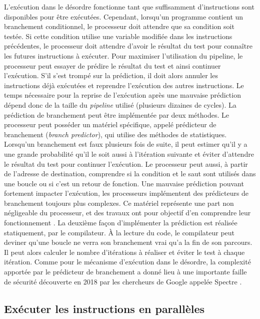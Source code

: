             L'exécution dans le désordre fonctionne tant que suffisamment d'instructions sont disponibles pour être exécutées. Cependant, lorsqu'un programme contient un branchement conditionnel, le processeur doit attendre que sa condition soit testée. Si cette condition utilise une variable modifiée dans les instructions précédentes, le processeur doit attendre d'avoir le résultat du test pour connaître les futures instructions à exécuter. Pour maximiser l'utilisation du pipeline, le processeur peut essayer de prédire le résultat du test et ainsi continuer l'exécution. S'il s'est trompé sur la prédiction, il doit alors annuler les instructions déjà exécutées et reprendre l'exécution des autres instructions. Le temps nécessaire pour la reprise de l'exécution après une mauvaise prédiction dépend donc de la taille du \textit{pipeline} utilisé (plusieurs dizaines de cycles).
            La prédiction de branchement peut être implémentée par deux méthodes.
            Le processeur peut posséder un matériel spécifique, appelé prédicteur de branchement (\textit{branch predictor}), qui utilise des méthodes de statistiques. Lorsqu'un branchement est faux plusieurs fois de suite, il peut estimer qu'il y a une grande probabilité qu'il le soit aussi à l'itération suivante et éviter d'attendre le résultat du test pour continuer l'exécution. Le processeur peut aussi, à partir de l'adresse de destination, comprendre si la condition et le saut sont utilisés dans une boucle ou si c'est un retour de fonction. Une mauvaise prédiction pouvant fortement impacter l'exécution, les processeurs implémentent des prédicteurs de branchement toujours plus complexes. Ce matériel représente une part non négligeable du processeur, et des travaux ont pour objectif d'en comprendre leur fonctionnement \cite{Milenkovic2002}.
            La deuxième façon d'implémenter la prédiction est réalisée statiquement, par le compilateur. À la lecture du code, le compilateur peut deviner qu'une boucle ne verra son branchement vrai qu'a la fin de son parcours. Il peut alors calculer le nombre d'itérations à réaliser et éviter le test à chaque itération.
            Comme pour le mécanisme d'exécution dans le désordre, la complexité apportée par le prédicteur de branchement a donné lieu à une importante faille de sécurité découverte en 2018 par les chercheurs de Google appelée Spectre \cite{kocher2018spectre}.



\subsection{Exécuter les instructions en parallèles} \label{sec:para}
    
